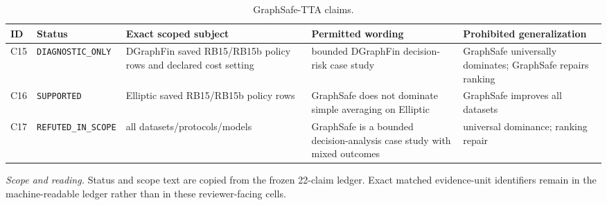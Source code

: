 \begin{table}[tbp]
\centering
\footnotesize
\setlength{\tabcolsep}{3.2pt}
\renewcommand{\arraystretch}{1.12}
\caption{GraphSafe-TTA claims.}
\label{tab:s-claims-graphsafe}
\begin{tabularx}{\textwidth}{@{}l >{\raggedright\arraybackslash}p{} Y Y Y@{}}
\toprule
\textbf{ID} & \textbf{Status} & \textbf{Exact scoped subject} & \textbf{Permitted wording} & \textbf{Prohibited generalization} \\
\midrule
C15 & \texttt{DIAGNOSTIC\_\allowbreak{}ONLY} & DGraphFin saved RB15/RB15b policy rows and declared cost setting & bounded DGraphFin decision-risk case study & GraphSafe universally dominates; GraphSafe repairs ranking \\
C16 & \texttt{SUPPORTED} & Elliptic saved RB15/RB15b policy rows & GraphSafe does not dominate simple averaging on Elliptic & GraphSafe improves all datasets \\
C17 & \texttt{REFUTED\_\allowbreak{}IN\_\allowbreak{}SCOPE} & all datasets/protocols/models & GraphSafe is a bounded decision-analysis case study with mixed outcomes & universal dominance; ranking repair \\
\bottomrule
\end{tabularx}
\vspace{2pt}
\begin{minipage}{\textwidth}\footnotesize\emph{Scope and reading.} Status and scope text are copied from the frozen 22-claim ledger. Exact matched evidence-unit identifiers remain in the machine-readable ledger rather than in these reviewer-facing cells.\end{minipage}
\end{table}
